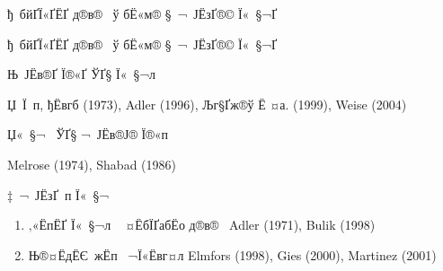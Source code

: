 
\def\mprp{\mbox{\tiny $\bot$}}
\def\mprl{\mbox{\tiny $\|$}}
\def\th{\mbox{th}}

\def\beq{\begin{eqnarray}}
\def\eeq{\end{eqnarray}}
\def\ee{\varepsilon}
\def\lm{\lambda}
\newcommand{\prp}[1]{#1_{\mbox{\tiny $\bot$}}}
\newcommand{\prl}[1]{#1_{\mbox{\tiny $\|$}}}
\def\HH{H\!\!\left(\frac{4 m_e^2}{\prl{q}^2}\right)}
\def\HHi{H\!\!\left(\frac{4 m_e^2}{\prl{q'^2}}\right)}
\def\HHii{H\!\!\left(\frac{4 m_e^2}{\prl{q''^2}}\right)}
\def\ggg{\gamma \rightarrow \gamma \gamma}
\def\ff{\Lambda}
\def\tff{\widetilde \Lambda}
\def\1{1 \to 1 \, 2}
\def\2{1 \to 2 \, 2}
\def\S{{\cal S}}
\def\J{{\cal J}}
\def\A{{\cal A}}
\def\P{{\cal P}}
\def\M{{\cal M}}
\def\Pab{{\cal P}_{\alpha \beta}}

\begin{Slide}{ђ бйҐЇ«Ґ­ЁҐ д®в®­  ў бЁ«м­® § ¬ Ј­ЁзҐ­­®© Ї« §¬Ґ} 

\vspace*{10mm}

\begin{center}

{\red\LARGE ђ бйҐЇ«Ґ­ЁҐ д®в®­  ў бЁ«м­® § ¬ Ј­ЁзҐ­­®© Ї« §¬Ґ}
\end{center}

\vspace*{10mm}

\begin{center}
\centerline{\darkgreen Њ Ј­Ёв­®Ґ Ї®«Ґ ЎҐ§ Ї« §¬л}
 {\blue Џ Ї ­п­, ђЁвгб (1973), Adler (1996), Љг§­Ґж®ў Ё ¤а. (1999), Weise (2004)}

\vspace*{5mm}

\centerline{\darkgreen Џ« §¬  ЎҐ§ ¬ Ј­Ёв­®Ј® Ї®«п}
{\blue Melrose (1974), Shabad (1986)}

\vspace*{5mm}

\centerline{\darkgreen ‡ ¬ Ј­ЁзҐ­­ п Ї« §¬ }

\begin{enumerate}
\item ‚«Ёп­ЁҐ Ї« §¬л ­  ¤ЁбЇҐабЁо д®в®­  {\blue  Adler (1971), Bulik (1998)} 

\item Њ®¤ЁдЁЄ жЁп  ¬Ї«Ёвг¤л {\blue Elmfors (1998), Gies (2000), Martinez (2001) }

\end{enumerate}

\end{center}

\end{Slide}

